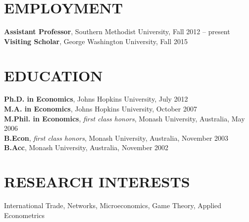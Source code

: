 \documentclass[11pt]{res}
\begin{document}
\begin{resume}
\hspace{-0.5in}\makebox[6.1in]{\hrulefill}

\section{EMPLOYMENT} \vspace{1.5mm}
{\bf Assistant Professor}, Southern Methodist University, Fall 2012 -- present\vspace{.5mm}\\
{\bf Visiting Scholar}, George Washington University, Fall 2015


\section{EDUCATION} \vspace{1.5mm}
    {\bf Ph.D. in Economics}, Johns Hopkins University, July 2012 \vspace{.5mm}\\
    {\bf M.A. in Economics}, Johns Hopkins University, October 2007\vspace{1.5mm}\\
    {\bf M.Phil. in Economics}, \emph{first class honors}, Monash University, Australia, May 2006\vspace{1.5mm}\\
    {\bf B.Econ}, \emph{first class honors}, Monash University, Australia, November 2003\vspace{1.5mm}\\
    {\bf B.Acc}, Monash University, Australia, November 2002


\section{RESEARCH INTERESTS}\vspace{1.5mm}
International Trade, Networks, Microeconomics, Game Theory, Applied Econometrics


\end{resume}
\end{document}

